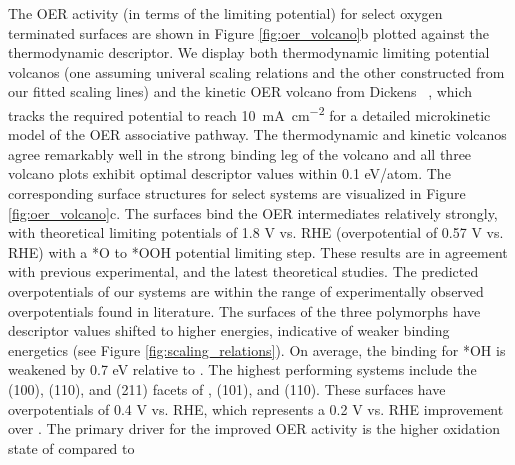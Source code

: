%
The OER activity (in terms of the limiting potential) for select oxygen terminated surfaces are shown in Figure \ref{fig:oer_volcano}b plotted against the \DGOmOH thermodynamic descriptor.
%
We display both thermodynamic limiting potential volcanos 
(one assuming univeral scaling relations and the other constructed from our fitted scaling lines)
and the kinetic OER volcano from Dickens ~\cite{Dickens2019},
which tracks the required potential to reach \SI[mode=text]{10}{\mA\per\cm\squared} for a detailed microkinetic model of the OER associative pathway.
%
The thermodynamic and kinetic volcanos agree remarkably well in the strong binding leg of the volcano and all three volcano plots exhibit optimal \DGOmOH descriptor values within \num{0.1} eV/atom.
%
The corresponding surface structures for select systems are visualized in Figure \ref{fig:oer_volcano}c.
%
The \rIrOtwo surfaces bind the OER intermediates relatively strongly,
with theoretical limiting potentials of \mytilde\num{1.8} V vs. RHE (overpotential of 0.57 V vs. RHE) with a *O to *OOH potential limiting step.
%
These results are in agreement with previous experimental, and the latest theoretical studies.
%
The predicted overpotentials of our \rIrOtwo systems are within the range of experimentally observed overpotentials found in literature.
%
The surfaces of the three \IrOthree polymorphs have \DGOmOH descriptor values shifted to higher energies, indicative of weaker binding energetics (see Figure \ref{fig:scaling_relations}).
%
On average, the binding for *OH is weakened by 0.7 eV relative to \IrOtwo.
%
The highest performing systems include the (100), (110), and (211) facets of \aIrOthree, \bIrOthree (101), and \rIrOthree (110).
%
These surfaces have overpotentials of \mytilde\num{0.4} V vs. RHE,
which represents a \mytilde\num{0.2} V vs. RHE improvement over \rIrOtwo.
%
The primary driver for the improved OER activity is the higher oxidation state of \IrOthree compared to \IrOtwo

